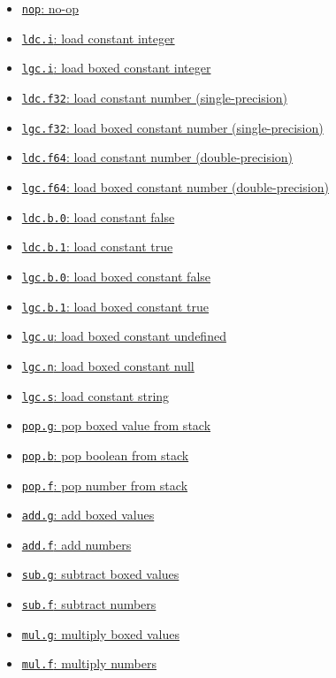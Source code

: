 \begin{itemize}
\begin{itemize}
\begin{itemize}
\item \hyperref[sec:orgbc7ec8d]{\texttt{nop}: no-op}
\item \hyperref[sec:orgc756866]{\texttt{ldc.i}: load constant integer}
\item \hyperref[sec:org5cf9345]{\texttt{lgc.i}: load boxed
constant integer}
\item \hyperref[sec:orgd3689f6]{\texttt{ldc.f32}: load
constant number (single-precision)}
\item \hyperref[sec:orgee247e4]{\texttt{lgc.f32}:
load boxed constant number (single-precision)}
\item \hyperref[sec:org6bba761]{\texttt{ldc.f64}: load
constant number (double-precision)}
\item \hyperref[sec:orgae88789]{\texttt{lgc.f64}:
load boxed constant number (double-precision)}
\item \hyperref[sec:org628c82c]{\texttt{ldc.b.0}: load constant false}
\item \hyperref[sec:org45a4edf]{\texttt{ldc.b.1}: load constant true}
\item \hyperref[sec:orgdf93d05]{\texttt{lgc.b.0}: load boxed
constant false}
\item \hyperref[sec:org79cc95f]{\texttt{lgc.b.1}: load boxed
constant true}
\item \hyperref[sec:org5d44e29]{\texttt{lgc.u}: load boxed
constant undefined}
\item \hyperref[sec:org1969f37]{\texttt{lgc.n}: load boxed constant
null}
\item \hyperref[sec:org2f69311]{\texttt{lgc.s}: load constant string}
\item \hyperref[sec:org5cb332a]{\texttt{pop.g}: pop boxed value
from stack}
\item \hyperref[sec:org55a65aa]{\texttt{pop.b}: pop boolean from
stack}
\item \hyperref[sec:orgf652769]{\texttt{pop.f}: pop number from stack}
\item \hyperref[sec:orgd3666a0]{\texttt{add.g}: add boxed values}
\item \hyperref[sec:org117c408]{\texttt{add.f}: add numbers}
\item \hyperref[sec:org379b868]{\texttt{sub.g}: subtract boxed values}
\item \hyperref[sec:org371fd15]{\texttt{sub.f}: subtract numbers}
\item \hyperref[sec:org742c65a]{\texttt{mul.g}: multiply boxed values}
\item \hyperref[sec:org29a8cb0]{\texttt{mul.f}: multiply numbers}

\end{itemize}
\end{itemize}
\end{itemize}
